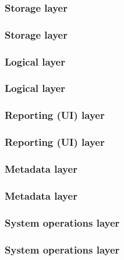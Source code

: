 \subsubsection{Storage layer}

\begin{frame}
    \frametitle{Storage layer}
\end{frame}
\subsubsection{Logical layer}

\begin{frame}
    \frametitle{Logical layer}
\end{frame}

\subsubsection{Reporting (UI) layer}

\begin{frame}
    \frametitle{Reporting (UI) layer}
\end{frame}

\subsubsection{Metadata layer}

\begin{frame}
    \frametitle{Metadata layer}
\end{frame}

\subsubsection{System operations layer}

\begin{frame}
    \frametitle{System operations layer}
\end{frame}


